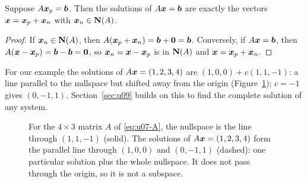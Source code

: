 \begin{proposition}\label{prop:u07-allsolutions}
Suppose $A\boldsymbol{x}_p=\boldsymbol{b}$. Then the solutions of $A\boldsymbol{x}=\boldsymbol{b}$ are exactly the vectors
$\boldsymbol{x}=\boldsymbol{x}_p+\boldsymbol{x}_n$ with $\boldsymbol{x}_n\in\mathbf{N}(A)$.
\end{proposition}

\begin{proof}
If $\boldsymbol{x}_n\in\mathbf{N}(A)$, then $A(\boldsymbol{x}_p+\boldsymbol{x}_n)=\boldsymbol{b}+\boldsymbol{0}=\boldsymbol{b}$. Conversely, if
$A\boldsymbol{x}=\boldsymbol{b}$, then $A(\boldsymbol{x}-\boldsymbol{x}_p)=\boldsymbol{b}-\boldsymbol{b}=\boldsymbol{0}$, so $\boldsymbol{x}_n=\boldsymbol{x}-\boldsymbol{x}_p$
is in $\mathbf{N}(A)$ and $\boldsymbol{x}=\boldsymbol{x}_p+\boldsymbol{x}_n$.
\end{proof}

For our example the solutions of $A\boldsymbol{x}=(1,2,3,4)$ are $(1,0,0)+c(1,1,-1)$: a line parallel
to the nullspace but shifted away from the origin (Figure~\ref{fig:u07-shifted}); $c=-1$ gives
$(0,-1,1)$. Section~\ref{sec:u09} builds on this to find the complete solution of any system.

\begin{figure}[ht]
\centering
{}
\caption{For the $4\times3$ matrix $A$ of \eqref{eq:u07-A}, the nullspace is the line through
$(1,1,-1)$ (solid). The solutions of $A\boldsymbol{x}=(1,2,3,4)$ form the parallel line through
$(1,0,0)$ and $(0,-1,1)$ (dashed): one particular solution plus the whole nullspace. It does
not pass through the origin, so it is not a subspace.}\label{fig:u07-shifted}
\end{figure}

